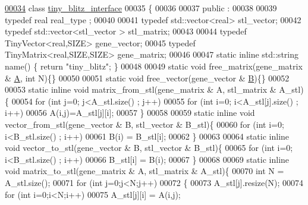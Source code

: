 \begin{DoxyCode}
\hyperlink{classtiny__blitz__interface}{00034} \textcolor{keyword}{class }\hyperlink{classtiny__blitz__interface}{tiny\_blitz\_interface}
00035 \{
00036 
00037 public :
00038 
00039   \textcolor{keyword}{typedef} real real\_type ;
00040 
00041   \textcolor{keyword}{typedef} std::vector<real>  stl\_vector;
00042   \textcolor{keyword}{typedef} std::vector<stl\_vector > stl\_matrix;
00043 
00044   \textcolor{keyword}{typedef} TinyVector<real,SIZE> gene\_vector;
00045   \textcolor{keyword}{typedef} TinyMatrix<real,SIZE,SIZE> gene\_matrix;
00046 
00047   \textcolor{keyword}{static} \textcolor{keyword}{inline} std::string name() \{ \textcolor{keywordflow}{return} \textcolor{stringliteral}{"tiny\_blitz"}; \}
00048 
00049   \textcolor{keyword}{static} \textcolor{keywordtype}{void} free\_matrix(gene\_matrix & \hyperlink{group___core___module_class_eigen_1_1_matrix}{A}, \textcolor{keywordtype}{int} N)\{\}
00050 
00051   \textcolor{keyword}{static} \textcolor{keywordtype}{void} free\_vector(gene\_vector & \hyperlink{group___core___module_class_eigen_1_1_matrix}{B})\{\}
00052 
00053   \textcolor{keyword}{static} \textcolor{keyword}{inline} \textcolor{keywordtype}{void} matrix\_from\_stl(gene\_matrix & A, stl\_matrix & A\_stl)\{
00054     \textcolor{keywordflow}{for} (\textcolor{keywordtype}{int} j=0; j<A\_stl.size() ; j++)
00055       \textcolor{keywordflow}{for} (\textcolor{keywordtype}{int} i=0; i<A\_stl[j].size() ; i++)
00056         A(i,j)=A\_stl[j][i];
00057   \}
00058 
00059   \textcolor{keyword}{static} \textcolor{keyword}{inline} \textcolor{keywordtype}{void} vector\_from\_stl(gene\_vector & B, stl\_vector & B\_stl)\{
00060     \textcolor{keywordflow}{for} (\textcolor{keywordtype}{int} i=0; i<B\_stl.size() ; i++)
00061       B(i) = B\_stl[i];
00062   \}
00063 
00064   \textcolor{keyword}{static} \textcolor{keyword}{inline} \textcolor{keywordtype}{void} vector\_to\_stl(gene\_vector & B, stl\_vector & B\_stl)\{
00065     \textcolor{keywordflow}{for} (\textcolor{keywordtype}{int} i=0; i<B\_stl.size() ; i++)
00066       B\_stl[i] = B(i);
00067   \}
00068 
00069   \textcolor{keyword}{static} \textcolor{keyword}{inline} \textcolor{keywordtype}{void} matrix\_to\_stl(gene\_matrix & A, stl\_matrix & A\_stl)\{
00070     \textcolor{keywordtype}{int} N = A\_stl.size();
00071     \textcolor{keywordflow}{for} (\textcolor{keywordtype}{int} j=0;j<N;j++)
00072     \{
00073       A\_stl[j].resize(N);
00074       \textcolor{keywordflow}{for} (\textcolor{keywordtype}{int} i=0;i<N;i++)
00075         A\_stl[j][i] = A(i,j);

\end{DoxyCode}
